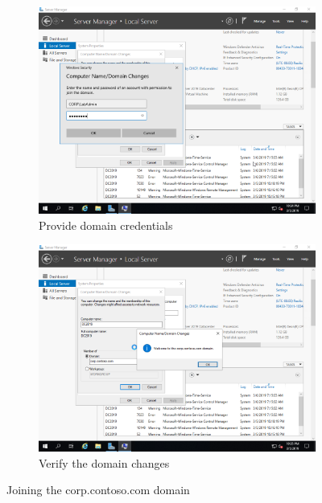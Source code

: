 \begin{figure}[!htb]\ContinuedFloat
	\begin{subfigure}{0.5\textwidth}
		\captionsetup{width=0.8\linewidth}
		\includegraphics[width=0.9\linewidth]{img/Methodologie/Migration12.png}
		\centering
		\caption{Provide domain credentials}
	\end{subfigure}
	\begin{subfigure}{0.5\textwidth}
		\captionsetup{width=0.8\linewidth}
		\includegraphics[width=0.9\linewidth]{img/Methodologie/Migration13.png} 
		\centering	
		\caption{Verify the domain changes}
	\end{subfigure}
	\caption[Joining the domain]{Joining the corp.contoso.com domain}
	\label{fig:Domain}
\end{figure}

